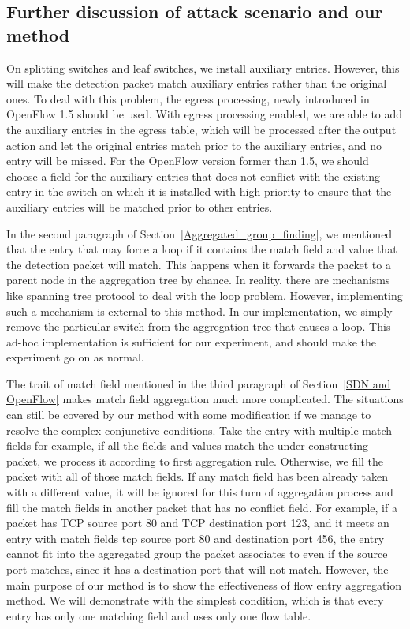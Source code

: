 \subsection{Further discussion of attack scenario and our method}
\label{Further_discussion}
On splitting switches and leaf switches, we install auxiliary entries. However, this will make the detection packet match auxiliary entries rather than the original ones. To deal with this problem, the egress processing, newly introduced in OpenFlow 1.5 \cite{OF_SPEC_15} should be used. With egress processing enabled, we are able to add the auxiliary entries in the egress table, which will be processed after the output action and let the original entries match prior to the auxiliary entries, and no entry will be missed. For the OpenFlow version former than 1.5, we should choose a field for the auxiliary entries that does not conflict with the existing entry in the switch on which it is installed with high priority to ensure that the auxiliary entries will be matched prior to other entries.

In the second paragraph of Section~\ref{Aggregated_group_finding}, we mentioned that the entry that may force a loop if it contains the match field and value that the detection packet will match. This happens when it forwards the packet to a parent node in the aggregation tree by chance. In reality, there are mechanisms like spanning tree protocol to deal with the loop problem. However, implementing such a mechanism is external to this method. In our implementation, we simply remove the particular switch from the aggregation tree that causes a loop. This ad-hoc implementation is sufficient for our experiment, and should make the experiment go on as normal.

The trait of match field mentioned in the third paragraph of Section~\ref{SDN and OpenFlow} makes match field aggregation much more complicated. The situations can still be covered by our method with some modification if we manage to resolve the complex conjunctive conditions. Take the entry with multiple match fields for example, if all the fields and values match the under-constructing packet, we process it according to first aggregation rule. Otherwise, we fill the packet with all of those match fields. If any match field has been already taken with a different value, it will be ignored for this turn of aggregation process and fill the match fields in another packet that has no conflict field. For example, if a packet has TCP source port 80 and TCP destination port 123, and it meets an entry with match fields tcp source port 80 and destination port 456, the entry cannot fit into the aggregated group the packet associates to even if the source port matches, since it has a destination port that will not match.\sout{} However, the main purpose of our method is to show the effectiveness of flow entry aggregation method. We will demonstrate with the simplest condition, which is that every entry has only one matching field and uses only one flow table.

